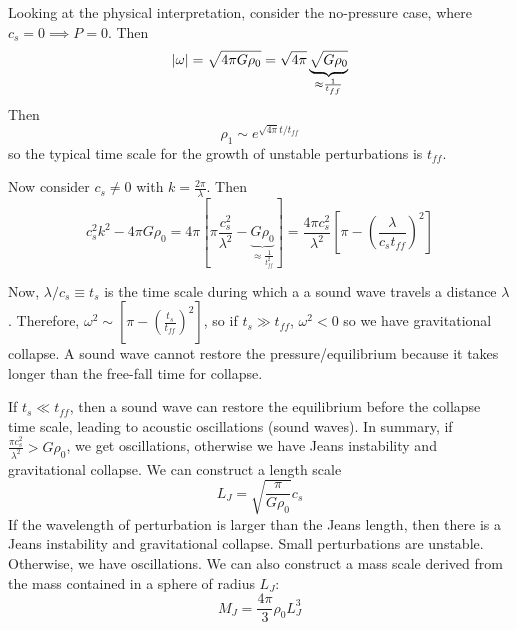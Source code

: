\documentclass[a4paper,twoside,master.tex]{subfiles}
\begin{document}

Looking at the physical interpretation, consider the no-pressure case, where $ c_s = 0 \implies P = 0 $. Then
\begin{equation}
    \abs{\omega} = \sqrt{4 \pi G \rho_0} = \sqrt{4 \pi} \underbrace{\sqrt{G \rho_0}}_{\approx \frac{1}{t_{ff}}}
\end{equation}
Then
\begin{equation}
    \rho_1 \sim e^{\sqrt{4 \pi} t/t_{ff}}
\end{equation}
so the typical time scale for the growth of unstable perturbations is $ t_{ff} $.

Now consider $ c_s \neq 0 $ with $ k = \frac{2 \pi}{\lambda} $. Then
\begin{equation}
    c_s^2 k^2 - 4 \pi G \rho_0 = 4 \pi \left[ \pi \frac{c_s^2}{\lambda^2} - \underbrace{G \rho_0}_{\approx \frac{1}{t^2_{ff}}} \right] = \frac{4 \pi c_s^2}{\lambda^2} \left[ \pi - \left( \frac{\lambda}{c_s t_{ff}} \right)^2 \right]
\end{equation}

Now, $ \lambda / c_s \equiv t_s $ is the time scale during which a a sound wave travels a distance $ \lambda $. Therefore, $ \omega^2 \sim \left[ \pi - \left( \frac{t_s}{t_{ff}} \right)^2 \right] $, so if $ t_s \gg t_{ff} $, $ \omega^2 < 0 $ so we have gravitational collapse. A sound wave cannot restore the pressure/equilibrium because it takes longer than the free-fall time for collapse.

If $ t_s \ll t_{ff} $, then a sound wave can restore the equilibrium before the collapse time scale, leading to acoustic oscillations (sound waves). In summary, if $ \frac{\pi c_s^2}{\lambda^2} > G \rho_0 $, we get oscillations, otherwise we have Jeans instability and gravitational collapse. We can construct a length scale
\begin{equation}
    L_J = \sqrt{\frac{\pi}{G \rho_0}} c_s \tag{Jeans Length}
\end{equation}
If the wavelength of perturbation is larger than the Jeans length, then there is a Jeans instability and gravitational collapse. Small perturbations are unstable. Otherwise, we have oscillations. We can also construct a mass scale derived from the mass contained in a sphere of radius $ L_J $:
\begin{equation}
    M_J = \frac{4 \pi}{3} \rho_0 L_J^3 \tag{Jeans Mass}
\end{equation}
\end{document}
